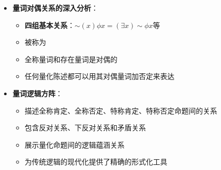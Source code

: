 \begin{center}
{{\begin{itemize}
\begin{itemize}
  \item 扩展了命题函项概念，包括否定符"$\sim$"
  \item \textbf{四大重要性}：增强表达能力、量词转换基础、系统完整性、批判思维
  \item 为量词间的相互转换提供了基础
  \item 使逻辑系统更加完整和对称
  \end{itemize}
\item \textbf{量词对偶关系的深入分析}：
  \begin{itemize}
  \item \textbf{四组基本关系}：$\sim(x)\phi x = (\exists x)\sim\phi x$等
  \item 被称为
  \item 全称量词和存在量词是对偶的
  \item 任何量化陈述都可以用其对偶量词加否定来表达
  \end{itemize}
\item \textbf{量词逻辑方阵}：
  \begin{itemize}
  \item 描述全称肯定、全称否定、特称肯定、特称否定命题间的关系
  \item 包含反对关系、下反对关系和矛盾关系
  \item 展示量化命题间的逻辑蕴涵关系
  \item 为传统逻辑的现代化提供了精确的形式化工具
  \end{itemize}
\end{itemize}
}}
\end{center}